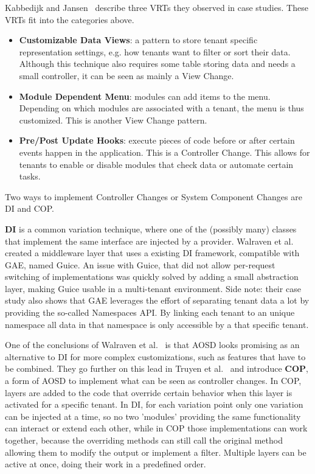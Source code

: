 Kabbedijk and Jansen~\cite{kabbedijk2011variability} describe three \acp{VRT} they observed in case studies. These \acp{VRT}  fit into the categories above.
\begin{itemize} 
\item \textbf{Customizable Data Views}: a pattern to store tenant specific representation settings, e.g. how tenants want to filter or sort their data. 
Although this technique also requires some table storing data and needs a small controller, it can be seen as mainly a View Change.
\item \textbf{Module Dependent Menu}: modules can add items to the menu. Depending on which modules are associated with a tenant, the menu is thus customized. This is another View Change pattern. 
\item \textbf{Pre/Post Update Hooks}: execute pieces of code before or after certain events happen in the application. This is a Controller Change. 
This allows for tenants to enable or disable modules that check data or automate certain tasks.
\end{itemize}

Two ways to implement Controller Changes or System Component Changes are \acl{DI} and \acl{COP}.

\textbf{\acf{DI}} is a common variation technique, where one of the (possibly many) classes that implement the same interface are injected by a provider. 
Walraven et al.~\cite{walraven2011middleware} created a middleware layer that uses a existing \ac{DI} framework, compatible with \ac{GAE}, named Guice. An issue with Guice, that did not allow per-request switching of implementations was quickly solved by adding a small abstraction layer, making Guice usable in a multi-tenant environment.
Side note: their case study also shows that \ac{GAE} leverages the effort of separating tenant data a lot by providing the so-called Namespaces API. By linking each tenant to an unique namespace all data in that namespace is only accessible by a that specific tenant.

One of the conclusions of Walraven et al.~\cite{walraven2011middleware} is that \ac{AOSD} looks promising as an alternative to \ac{DI} for more complex customizations, such as features that have to be combined.
They go further on this lead in Truyen et al.~\cite{truyen2012context} and introduce \textbf{\ac{COP}}, a form of \ac{AOSD} to implement what can be seen as controller changes. 
In \ac{COP}, layers are added to the code that override certain behavior when this layer is activated for a specific tenant. 
In \ac{DI}, for each variation point only one variation can be injected at a time, so no two 'modules' providing the same functionality can interact or extend each other, while in \ac{COP} those implementations can work together, because the overriding methods can still call the original method allowing them to modify the output or implement a filter. 
Multiple layers can be active at once, doing their work in a predefined order. 

